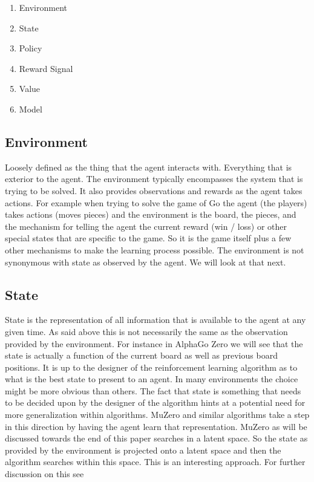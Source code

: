     
    \begin{enumerate}
        \item Environment
        \item State
        \item Policy
        \item Reward Signal 
        \item Value
        \item Model
    \end{enumerate}
    
    \subsection{Environment}
    
    Loosely defined as the thing that the agent interacts with. Everything that is exterior to the agent. The environment typically encompasses the system that is trying to be solved. It also provides observations and rewards as the agent takes actions. For example when trying to solve the game of Go the agent (the players) takes actions (moves pieces) and the environment is the board, the pieces, and the mechanism for telling the agent the current reward (win / loss) or other special states that are specific to the game. So it is the game itself plus a few other mechanisms to make the learning process possible. The environment is not synonymous with state as observed by the agent. We will look at that next. 
    
    \subsection{State}
    
    State is the representation of all information that is available to the agent at any given time. As said above this is not necessarily the same as the observation provided by the environment. For instance in AlphaGo Zero we will see that the state is actually a function of the current board as well as previous board positions. It is up to the designer of the reinforcement learning algorithm as to what is the best state to present to an agent. In many environments the choice might be more obvious than others. 
    The fact that state is something that needs to be decided upon by the designer of the algorithm hints at a potential need for more generalization within algorithms. MuZero and similar algorithms take a step in this direction by having the agent learn that representation. MuZero as will be discussed towards the end of this paper searches in a latent space. So the state as provided by the environment is projected onto a latent space and then the algorithm searches within this space. This is an interesting approach. For further discussion on this see \cite{predictron,muzero}
    
